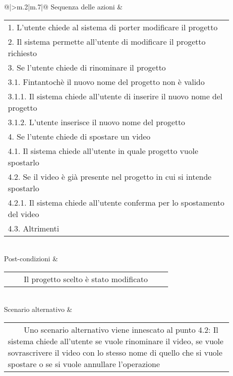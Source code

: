 \begin{table}[H]
\begin{longtable}{@{}|>{\centering\arraybackslash}m{.2\textwidth}|m{.7\textwidth}|@{}}
		Sequenza delle azioni & \begin{tabular}{m{0.9\linewidth}}\hspace{0.0cm}1. L'utente chiede al sistema di porter modificare il progetto\\\hspace{0.0cm}2. Il sistema permette all'utente di modificare il progetto richiesto\\\hspace{0.0cm}3. Se l'utente chiede di rinominare il progetto\\\hspace{0.5cm}\hspace{0.0cm}3.1. Fintantochè il nuovo nome del progetto non è valido\\\hspace{1.0cm}\hspace{0.5cm}\hspace{0.0cm}3.1.1. Il sistema chiede all'utente di inserire il nuovo nome del progetto\\\hspace{1.0cm}\hspace{0.5cm}\hspace{0.0cm}3.1.2. L'utente inserisce il nuovo nome del progetto\\\hspace{0.0cm}4. Se l'utente chiede di spostare un video\\\hspace{0.5cm}\hspace{0.0cm}4.1. Il sistema chiede all'utente in quale progetto vuole spostarlo\\\hspace{0.5cm}\hspace{0.0cm}4.2. Se il video è già presente nel progetto in cui si intende spostarlo\\\hspace{1.0cm}\hspace{0.5cm}\hspace{0.0cm}4.2.1. Il sistema chiede all'utente conferma per lo spostamento del video\\\hspace{0.5cm}\hspace{0.0cm}4.3. Altrimenti\\\end{tabular}\\
		Post-condizioni & \begin{tabular}{m{0.9\linewidth}}~~\llap{\textbullet}~~Il progetto scelto è stato modificato\\\end{tabular}\\
		Scenario alternativo & \begin{tabular}{m{0.9\linewidth}}~~\llap{\textbullet}~~Uno scenario alternativo viene innescato al punto 4.2: Il sistema chiede all'utente se vuole rinominare il video, se vuole sovrascrivere il video con lo stesso nome di quello che si vuole spostare o se si vuole annullare l'operazione\\\end{tabular}\\\hline
		

\end{longtable}
\end{table}
